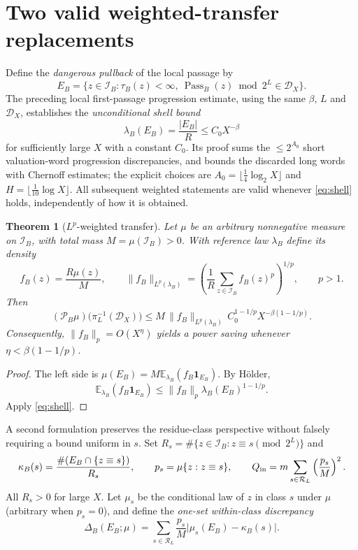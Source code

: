 \documentclass[10pt]{amsart}
\newtheorem{theorem}{Theorem}
\theoremstyle{definition}\newtheorem{definition}{Definition}
\theoremstyle{remark}\newtheorem{remark}{Remark}
\newcommand{\Pass}{\operatorname{Pass}}
\newcommand{\E}{\mathbb E}
\newcommand{\one}{\mathbf 1}
\newcommand{\cI}{\mathcal I}
\newcommand{\cR}{\mathcal R}
\newcommand{\cD}{\mathcal D}
\newcommand{\cP}{\mathcal P}
\begin{document}
\section{Two valid weighted-transfer replacements}
Define the \emph{dangerous pullback} of the local passage by
\begin{equation}\label{eq:E}
 E_B=\{z\in\cI_B:\tau_B(z)<\infty,\ \Pass_B(z)\bmod 2^L\in\cD_X\}.
\end{equation}
The preceding local first-passage progression estimate, using the same $\beta$, $L$ and $\cD_X$, establishes the \emph{unconditional shell bound}
\begin{equation}\label{eq:shell}
 \lambda_B(E_B)=\frac{|E_B|}{R}\le C_0 X^{-\beta}
\end{equation}
for sufficiently large $X$ with a constant $C_0$. Its proof sums the $\le 2^{A_0}$ short valuation-word progression discrepancies, and bounds the discarded long words with Chernoff estimates; the explicit choices are $A_0=\lfloor\tfrac14\log_2X\rfloor$ and $H=\lfloor\tfrac1{10}\log X\rfloor$. All subsequent weighted statements are valid whenever \eqref{eq:shell} holds, independently of how it is obtained.

\begin{theorem}[$L^p$-weighted transfer]\label{thm:lp}
Let $\mu$ be an arbitrary nonnegative measure on $\cI_B$, with total mass $M=\mu(\cI_B)>0$. With reference law $\lambda_B$ define its density
\[
 f_B(z)=\frac{R\mu(z)}{M},\qquad
 \|f_B\|_{L^p(\lambda_B)}=
 \left(\frac1R\sum_{z\in\cI_B}f_B(z)^p\right)^{1/p},\qquad p>1.
\]
Then
\begin{equation}\label{eq:lp}
 \boxed{\ (\cP_B\mu)\bigl(\pi_L^{-1}(\cD_X)\bigr)
 \le M\,\|f_B\|_{L^p(\lambda_B)}\,C_0^{1-1/p}
 X^{-\beta(1-1/p)}.\ }
\end{equation}
Consequently, $\|f_B\|_p=O(X^\eta)$ yields a power saving whenever $\eta<\beta(1-1/p)$.
\end{theorem}
\begin{proof}
The left side is $\mu(E_B)=M\E_{\lambda_B}(f_B\one_{E_B})$. By H\"older,
\[
 \E_{\lambda_B}(f_B\one_{E_B})
 \le\|f_B\|_p\lambda_B(E_B)^{1-1/p}.
\]
Apply \eqref{eq:shell}.
\end{proof}

A second formulation preserves the residue-class perspective without falsely requiring a bound uniform in $s$. Set $R_s=\#\{z\in\cI_B:z\equiv s\pmod{2^L}\}$ and
\[
 \kappa_B(s)=\frac{\#(E_B\cap\{z\equiv s\})}{R_s},\qquad
 p_s=\mu\{z:z\equiv s\},\qquad
 Q_{\rm in}=m\sum_{s\in\cR_L}\left(\frac{p_s}{M}\right)^2.
\]
All $R_s>0$ for large $X$. Let $\mu_s$ be the conditional law of $z$ in class $s$ under $\mu$ (arbitrary when $p_s=0$), and define the \emph{one-set within-class discrepancy}
\begin{equation}\label{eq:delta}
 \Delta_B(E_B;\mu)=\sum_{s\in\cR_L}\frac{p_s}{M}
 \bigl|\mu_s(E_B)-\kappa_B(s)\bigr|.
\end{equation}
\end{document}
